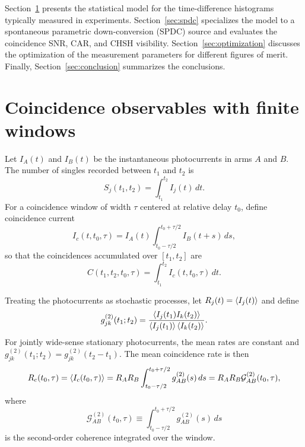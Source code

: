 \documentclass[a4paper,10pt]{article}
\begin{document}
Section~\ref{sec:coincidence_observables} presents the statistical model for the time-difference histograms typically measured in experiments.  Section~\ref{sec:spdc} specializes the model to a spontaneous parametric down-conversion (SPDC) source and evaluates the coincidence SNR, CAR, and CHSH visibility.  Section~\ref{sec:optimization} discusses the optimization of the measurement parameters for different figures of merit.  Finally, Section~\ref{sec:conclusion} summarizes the conclusions.

\section{Coincidence observables with finite windows}
\label{sec:coincidence_observables}

Let $I_A(t)$ and $I_B(t)$ be the instantaneous photocurrents in arms $A$ and $B$.  The number of singles recorded between $t_1$ and $t_2$ is
\begin{equation}
    S_j(t_1,t_2)=\int_{t_1}^{t_2}I_j(t)\,dt.
\end{equation}
For a coincidence window of width $\tau$ centered at relative delay $t_0$, define coincidence current
\begin{equation}
    I_c(t,t_0,\tau)
    =I_A(t)\int_{t_0-\tau/2}^{t_0+\tau/2}I_B(t+s)\,ds,
\end{equation}
so that the coincidences accumulated over $[t_1,t_2]$ are
\begin{equation}
    C(t_1,t_2,t_0,\tau)
    =\int_{t_1}^{t_2}I_c(t,t_0,\tau)\,dt.
\end{equation}

Treating the photocurrents as stochastic processes, let $R_j(t)=\expval{I_j(t)}$ and define
\begin{equation}
    g^{(2)}_{jk}(t_1;t_2)
    =\frac{\expval{I_j(t_1)I_k(t_2)}}
           {\expval{I_j(t_1)}\expval{I_k(t_2)}}.
\end{equation}
For jointly wide-sense stationary photocurrents, the mean rates are constant and $g^{(2)}_{jk}(t_1;t_2)=g^{(2)}_{jk}(t_2-t_1)$.  The mean coincidence rate is then
\begin{equation}
    R_c(t_0,\tau)
    =\expval{I_c(t_0,\tau)}
    =R_A R_B\int_{t_0-\tau/2}^{t_0+\tau/2}g^{(2)}_{AB}(s)\,ds
    =R_A R_B\mathcal{G}^{(2)}_{AB}(t_0,\tau),
\end{equation}
where
\begin{equation}
    \mathcal{G}^{(2)}_{AB}(t_0,\tau)
    \equiv\int_{t_0-\tau/2}^{t_0+\tau/2}g^{(2)}_{AB}(s)\,ds
\end{equation}
is the second-order coherence integrated over the window.
\end{document}
